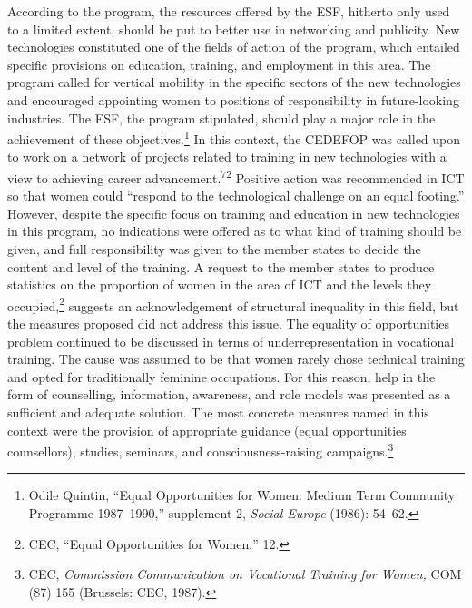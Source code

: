 \documentclass{tufte-handout}
\begin{document}
According to the program, the resources offered by the ESF, hitherto
only used to a limited extent, should be put to better use in networking
and publicity. New technologies constituted one of the fields of action
of the program, which entailed specific provisions on education,
training, and employment in this area. The program called for vertical
mobility in the specific sectors of the new technologies and encouraged
appointing women to positions of responsibility in future-looking
industries. The ESF, the program stipulated, should play a major role in
the achievement of these objectives.\footnote{Odile Quintin, ``Equal
  Opportunities for Women: Medium Term Community Programme 1987--1990,''
  supplement 2, \emph{Social Europe} (1986): 54--62.} In this context,
the CEDEFOP was called upon to work on a network of projects related to
training in new technologies with a view to achieving career
advancement.\textsuperscript{72} Positive action was recommended in ICT so
that women could ``respond to the technological challenge on an equal
footing.'' However, despite the specific focus on training and education
in new technologies in this program, no indications were offered as to
what kind of training should be given, and full responsibility was given
to the member states to decide the content and level of the training. A
request to the member states to produce statistics on the proportion of
women in the area of ICT and the levels they occupied,\footnote{CEC,
  ``Equal Opportunities for Women,'' 12.} suggests an acknowledgement of
structural inequality in this field, but the measures proposed did not
address this issue. The equality of opportunities problem continued to
be discussed in terms of underrepresentation in vocational training. The
cause was assumed to be that women rarely chose technical training and
opted for traditionally feminine occupations. For this reason, help in
the form of counselling, information, awareness, and role models was
presented as a sufficient and adequate solution. The most concrete
measures named in this context were the provision of appropriate
guidance (equal opportunities counsellors), studies, seminars, and
consciousness-raising campaigns.\footnote{CEC, \emph{Commission
  Communication on Vocational Training for Women,} COM (87) 155
  (Brussels: CEC, 1987).}
\end{document}
